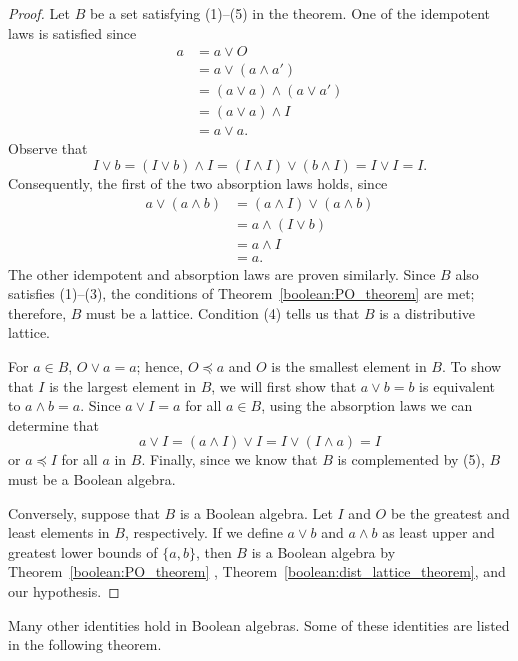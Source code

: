  
\begin{proof}
Let $B$ be a set satisfying (1)--(5) in the theorem.  One of the
idempotent laws is satisfied since
\begin{align*}
a & = a \vee O \\
& = a \vee (a \wedge a') \\
& = (a \vee a) \wedge (a \vee a') \\
& = (a \vee a ) \wedge I \\
& = a \vee a.
\end{align*}
Observe that 
\[
I \vee b = (I \vee b ) \wedge I = (I \wedge I) \vee (b \wedge I) = I
\vee I =  I.  
\]
Consequently, the first of the two absorption laws holds, since
\begin{align*}
a \vee (a \wedge b) & = (a \wedge I) \vee (a \wedge b) \\
& = a \wedge (I \vee b) \\
& = a  \wedge I \\
& = a.
\end{align*}
The other idempotent and absorption laws are proven similarly. Since
$B$ also satisfies (1)--(3), the conditions of Theorem~\ref{boolean:PO_theorem} are met;
therefore, $B$ must be a lattice.  Condition (4) tells us that $B$ is
a distributive lattice.
 
 
For $a \in B$, $O \vee a = a$; hence, $O \preceq a$ and $O$ is the
smallest element in $B$. To show that $I$ is the largest element in
$B$, we will first show that $a \vee b = b$ is equivalent to $a \wedge
b = a$.  Since $a \vee I = a$ for all $a \in B$, using the absorption
laws we can determine that
\[
a \vee I =(a \wedge I) \vee I = I \vee ( I \wedge a) = I
\]
or $a \preceq I$ for all $a$ in $B$. Finally, since we know that $B$
is complemented by (5), $B$ must be a Boolean algebra. 
 
 
Conversely, suppose that $B$ is a Boolean algebra. Let $I$ and $O$ be
the greatest and least elements in $B$, respectively.  If we define $a
\vee b$ and $a \wedge b$ as least upper and greatest lower bounds of
$\{ a, b\}$, then $B$ is a Boolean algebra by Theorem~\ref{boolean:PO_theorem} , 
Theorem~\ref{boolean:dist_lattice_theorem}, and our hypothesis. 
\end{proof}
 
 
\medskip
 
 
Many other identities hold in Boolean algebras.  Some of these
identities are listed in the following theorem. 
 
